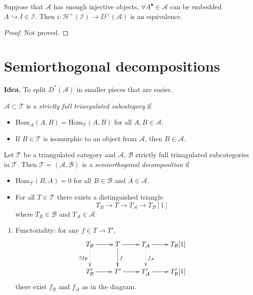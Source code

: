 \begin{lemma}
\label{dcos-label-018}
Suppose that $\mathcal{A}$ has enough
injective objects, $\forall A^\bullet \in
\mathcal{A}$ can be embedded $A
\hookrightarrow I \in\mathcal{I}$. Then
$i:\mathcal{H}^+(\mathcal{I}) \to
D^+(\mathcal{A})$ is an equivalence.
\end{lemma}

\begin{proof}
Not proved.
\end{proof}

\section{Semiorthogonal decompositions}
\label{dcos-label-032}

{\bf Idea.} To split $D^*(\mathcal{A})$ in
smaller pieces that are easier.

\begin{definition}
\label{dcos-label-019}
$\mathcal{A} \subset \mathcal{T}$ is a {\it
strictly full triangulated subcategory} if
\begin{itemize}
\item
$\text{Hom}_{\mathcal{A}}(A,B)=\text{Hom}
_{\mathcal{T}}(A,B)$
for all $A,B
\in \mathcal{A}$.
\item If  $B \in \mathcal{T}$ is isomorphic
to an object from $\mathcal{A}$,
then $B \in \mathcal{A}$.
\end{itemize}
\end{definition}

\begin{definition}
\label{dcos-label-020}
Let $\mathcal{T}$ be a triangulated category
and $\mathcal{A}$, $\mathcal{B}$ strictly
full trinagulated subcategories in
$\mathcal{T}$. Then
$\mathcal{T}=\left\langle{}\mathcal{A},\mathcal{B}
\right\rangle{}$
is a {\it semiorthogonal decomposition} if
\begin{itemize}
\item $\text{Hom}_{\mathcal{T}}(B,A)=0$ for
all $B \in \mathcal{B}$ and $A\in
\mathcal{A}$.
\item For all $T \in \mathcal{T}$ there
exists a distinguished triangle
$$
T_B \to T \to T_{\mathcal{A}}\to
T_{\mathcal{B}}[1]
$$
where $T_B \in \mathcal{B}$ and
$T_\mathcal{A} \in \mathcal{A}$.
\end{itemize}
\end{definition}

\begin{proposition}
\label{dcos-label-021}
\begin{enumerate}
\item Functoriality: for any $f \in T \to
T'$,
$$
\xymatrix{
T_{\mathcal{B}}\ar@{.>}[d]_{\exists
f_{\mathcal{B}}}\ar[r]& T\ar[d]^f\ar[r]
&
T_{\mathcal{A}}\ar@{.>}[d]^{f_{\mathcal{A}}}
\ar[r]&
T_{\mathcal{B}}[1]\\
T_{\mathcal{B}}'\ar[r]& T'\ar[r]&
T'_{\mathcal{A}}\ar[r]& T'_{\mathcal{B}}[1]
}
$$
there exist $f_{\mathcal{B}}$ and
$f_{\mathcal{A}}$ as in the diagram.
\end{enumerate}
\end{proposition}

